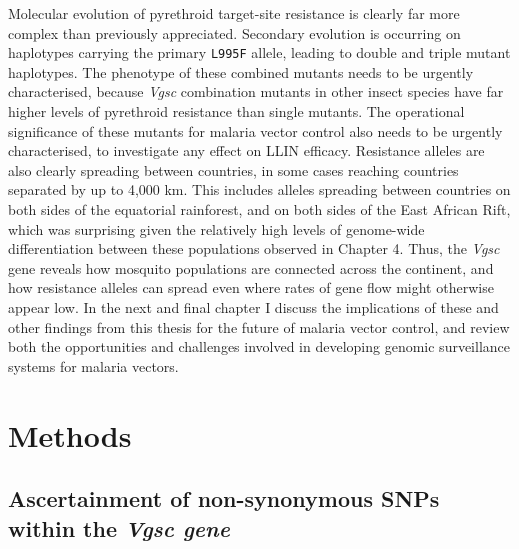 \begin{refsection}
Molecular evolution of pyrethroid target-site resistance is clearly far more complex than previously appreciated.
%
Secondary evolution is occurring on haplotypes carrying the primary \texttt{L995F} allele, leading to double and triple mutant haplotypes.
%
The phenotype of these combined mutants needs to be urgently characterised, because \textit{Vgsc} combination mutants in other insect species have far higher levels of pyrethroid resistance than single mutants.
%
The operational significance of these mutants for malaria vector control also needs to be urgently characterised, to investigate any effect on LLIN efficacy.
%
Resistance alleles are also clearly spreading between countries, in some cases reaching countries separated by up to 4,000 km.
%
This includes alleles spreading between countries on both sides of the equatorial rainforest, and on both sides of the East African Rift, which was surprising given the relatively high levels of genome-wide differentiation between these populations observed in Chapter 4.
%
Thus, the \textit{Vgsc} gene reveals how mosquito populations are connected across the continent, and how resistance alleles can spread even where rates of gene flow might otherwise appear low.
%
In the next and final chapter I discuss the implications of these and other findings from this thesis for the future of malaria vector control, and review both the opportunities and challenges involved in developing genomic surveillance systems for malaria vectors.


\section{Methods}\label{sec:ch6-methods}


\subsection{Ascertainment of non-synonymous SNPs within the \textit{Vgsc gene}}\label{subsec:methods-asc}



\end{refsection}

